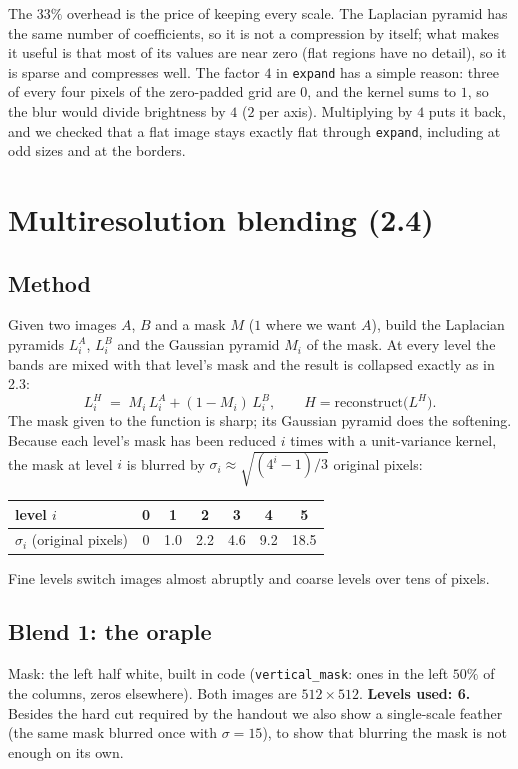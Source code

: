 \documentclass[11pt,a4paper]{article}
\begin{document}
\begin{whybox}
The $33\%$ overhead is the price of keeping every scale. The Laplacian pyramid has the same number of coefficients, so it is not a compression by itself;
what makes it useful is that most of its values are near zero (flat regions have no detail), so it is sparse and compresses well. The factor $4$ in
\texttt{expand} has a simple reason: three of every four pixels of the zero-padded grid are $0$, and the kernel sums to $1$, so the blur would
divide brightness by $4$ ($2$ per axis). Multiplying by $4$ puts it back, and we checked that a flat image stays exactly flat through \texttt{expand},
including at odd sizes and at the borders.
\end{whybox}

\section{Multiresolution blending (2.4)}

\subsection{Method}
Given two images $A$, $B$ and a mask $M$ ($1$ where we want $A$), build the Laplacian pyramids $L^A_i$, $L^B_i$ and the Gaussian
pyramid $M_i$ of the mask. At every level the bands are mixed with that level's mask and the result is collapsed exactly as in 2.3:
\begin{equation}
  L^{H}_i \;=\; M_i\,L^A_i + (1-M_i)\,L^B_i ,\qquad H=\text{reconstruct}\bigl(L^H\bigr).
\end{equation}
The mask given to the function is sharp; its Gaussian pyramid does the softening. Because each level's mask has been
reduced $i$ times with a unit-variance kernel, the mask at level $i$ is blurred by $\sigma_i\approx\sqrt{(4^i-1)/3}$ original pixels:
\begin{center}
\small
\begin{tabular}{@{}lcccccc@{}}
\toprule
level $i$ & 0 & 1 & 2 & 3 & 4 & 5\\
\midrule
$\sigma_i$ (original pixels) & 0 & 1.0 & 2.2 & 4.6 & 9.2 & 18.5\\
\bottomrule
\end{tabular}
\end{center}
Fine levels switch images almost abruptly and coarse levels over tens of pixels.

\subsection{Blend 1: the oraple}
Mask: the left half white, built in code (\texttt{vertical\_mask}: ones in the left $50\%$ of the columns, zeros elsewhere). Both
images are $512\times512$. \textbf{Levels used: 6.}
Besides the hard cut required by the handout we also show a single-scale feather (the same mask blurred once with
$\sigma=15$), to show that blurring the mask is not enough on its own.
\end{document}

